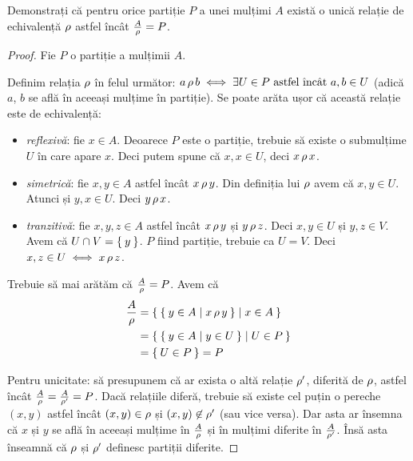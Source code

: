 \begin{exercise}
Demonstrați că pentru orice partiție \(P\) a unei mulțimi \(A\) există o unică relație de echivalență \(\operatorname{\rho}\) astfel încât \(\frac{A}{\operatorname{\rho}} = P\).
\end{exercise}
\begin{proof}
Fie \(P\) o partiție a mulțimii \(A\).

Definim relația \(\operatorname{\rho}\) în felul următor: \(a \operatorname{\rho} b \iff \exists U \in P \text{ astfel încât } a, b \in U\) (adică \(a\), \(b\) se află în aceeași mulțime în partiție). Se poate arăta ușor că această relație este de echivalență:
\begin{itemize}
    \item \emph{reflexivă}: fie \(x \in A\). Deoarece \(P\) este o partiție, trebuie să existe o submulțime \(U\) în care apare \(x\). Deci putem spune că \(x, x \in U\), deci \(x \operatorname{\rho} x\).
    \item \emph{simetrică}: fie \(x, y \in A\) astfel încât \(x \operatorname{\rho} y\). Din definiția lui \(\operatorname{\rho}\) avem că \(x, y \in U\). Atunci și \(y, x \in U\). Deci \(y \operatorname{\rho} x\).
    \item \emph{tranzitivă}: fie \(x, y, z \in A\) astfel încât \(x \operatorname{\rho} y\) și \(y \operatorname{\rho} z\). Deci \(x, y \in U\) și \(y, z \in V\). Avem că \(U \cap V = \Set{y}\). \(P\) fiind partiție, trebuie ca \(U = V\). Deci \(x, z \in U \iff x \operatorname{\rho} z\).
\end{itemize}

Trebuie să mai arătăm că \(\frac{A}{\operatorname{\rho}} = P\). Avem că
\begin{align*}
    \frac{A}{\operatorname{\rho}} &= \Set{ \Set{ y \in A | x \operatorname{\rho}y } | x \in A } \\
    &= \Set{ \Set{ y \in A | y \in U } | U \in P } \\
    &= \Set{ U \in P } = P
\end{align*}

Pentru unicitate: să presupunem că ar exista o altă relație \(\operatorname{\rho}'\), diferită de \(\operatorname{\rho}\), astfel încât \(\frac{A}{\operatorname{\rho}} = \frac{A}{\operatorname{\rho}'} = P\). Dacă relațiile diferă, trebuie să existe cel puțin o pereche \((x, y)\) astfel încât \((x, y) \in \operatorname{\rho}\) și \((x, y) \not\in \operatorname{\rho}'\) (sau vice versa). Dar asta ar însemna că \(x\) și \(y\) se află în aceeași mulțime în \(\frac{A}{\operatorname{\rho}}\) și în mulțimi diferite în \(\frac{A}{\operatorname{\rho}'}\). Însă asta înseamnă că \(\operatorname{\rho}\) și \(\operatorname{\rho}'\) definesc partiții diferite.
\end{proof}
